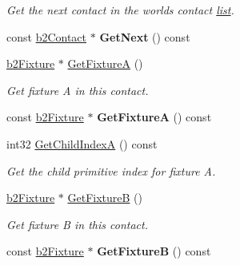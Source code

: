 \begin{DoxyCompactItemize}
\begin{DoxyCompactList}\small\item\em Get the next contact in the world\textquotesingle{}s contact \hyperlink{protocollist-p}{list}. \end{DoxyCompactList}\item 
\mbox{\label{classb2Contact_a5231c6fe1b2b374ac9909a248aee0c98}} 
const \hyperlink{classb2Contact}{b2\+Contact} $\ast$ {\bfseries Get\+Next} () const
\item 
\mbox{\label{classb2Contact_a707a3a5a14c2cdd4c6eb7fc648d76037}} 
\hyperlink{classb2Fixture}{b2\+Fixture} $\ast$ \hyperlink{classb2Contact_a707a3a5a14c2cdd4c6eb7fc648d76037}{Get\+FixtureA} ()
\begin{DoxyCompactList}\small\item\em Get fixture A in this contact. \end{DoxyCompactList}\item 
\mbox{\label{classb2Contact_ad3c9e8c69128efbe03af632c1acc7776}} 
const \hyperlink{classb2Fixture}{b2\+Fixture} $\ast$ {\bfseries Get\+FixtureA} () const
\item 
\mbox{\label{classb2Contact_aa0b0739e6615ba8d38e9b5bd8761dc31}} 
int32 \hyperlink{classb2Contact_aa0b0739e6615ba8d38e9b5bd8761dc31}{Get\+Child\+IndexA} () const
\begin{DoxyCompactList}\small\item\em Get the child primitive index for fixture A. \end{DoxyCompactList}\item 
\mbox{\label{classb2Contact_a68464fe587d7e6a1f52763e965bb7361}} 
\hyperlink{classb2Fixture}{b2\+Fixture} $\ast$ \hyperlink{classb2Contact_a68464fe587d7e6a1f52763e965bb7361}{Get\+FixtureB} ()
\begin{DoxyCompactList}\small\item\em Get fixture B in this contact. \end{DoxyCompactList}\item 
\mbox{\label{classb2Contact_aa89780a20a2b7cd424c09adca9917546}} 
const \hyperlink{classb2Fixture}{b2\+Fixture} $\ast$ {\bfseries Get\+FixtureB} () const
\item 

\end{DoxyCompactItemize}
